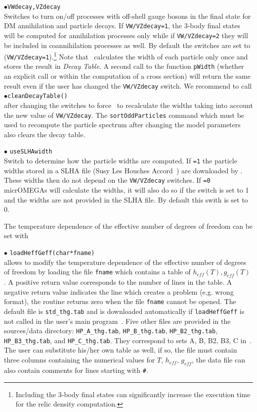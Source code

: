 \documentclass[12pt,a4paper]{article}
\begin{document}
\noindent
$\bullet$\verb|VWdecay,VZdecay|\\
Switches to turn on/off  processes with off-shell gauge bosons in the final state for DM annihilation and particle decays.
If \verb|VW/VZdecay=1|, the  3-body final states will be computed for annihilation processes only while 
if \verb|VW/VZdecay=2| they will be included in coannihilation processes as well.
By  default  the switches are set to (\verb|VW/VZdecay=1|).\footnote{Including the 3-body final states can significantly increase the execution time for the relic density computation.}
Note that \micro\ calculates the width of each particle only once and stores the
result in {\it Decay Table}.  A second call to the function \verb|pWidth| (whether an explicit call or within the computation of a cross section)   will return the same result  even if the user has changed the {\tt VW/VZdecay} switch.  
We recommend to call\\
$\bullet$\verb|cleanDecayTable()| \\
after changing the switches to force \micro\ to recalculate the widths taking into account  the new value of {\tt VW/VZdecay}.
The   {\tt sortOddParticles} command which must be used 
to recompute the particle spectrum after changing the model parameters also clears  the decay table.

\noindent
$\bullet$ \verb|useSLHAwidth|\\
Switch to  determine how the particle widths are computed. 
If {\tt =1} the particle widths  stored in  a SLHA file (Susy Les Houches Accord~\cite{Skands:2003cj})  are downloaded by \micro. 
These widths  then do not depend on  the {\tt VW/VZdecay} switches. 
If {\tt =0} micrOMEGAs will calculate the widths, it will also do so if the switch is set to 1 and the widths  are not provided in the SLHA file. By default this swith is set to 0. 


 

The temperature dependence of the effective number of degrees of freedom can be set with

\noindent$\bullet$ \verb|loadHeffGeff(char*fname)|\\
allows to modify the temperature dependence of the effective number of degrees of freedom
by loading the file \verb|fname| which contains a table of $h_{eff}(T), g_{eff}(T)$ . 
A positive  return value corresponds to the number of lines in the table. A negative return value indicates the line which creates a problem (e.g. wrong format), the routine returns zero when the file \verb|fname| cannot be opened.  The default file is \verb|std_thg.tab| and is downloaded automatically if 
\verb|loadHeffGeff| is not called in the user's main program~\cite{Gondolo:2004sc}. Five other files are provided in the sources/data directory:  \verb|HP_A_thg.tab|,  \verb|HP_B_thg.tab|, \verb|HP_B2_thg.tab|,  \verb|HP_B3_thg.tab|,    and \verb|HP_C_thg.tab|. They   correspond to sets A, B, B2, B3, C in~\cite{Hindmarsh:2005ix}.
The user can substitute his/her own table as well, if so, the file must contain three columns containing the numerical values for $T$, $h_{eff}$, $g_{eff}$, the data file can also contain comments for lines starting with \verb|#|.
\end{document}
